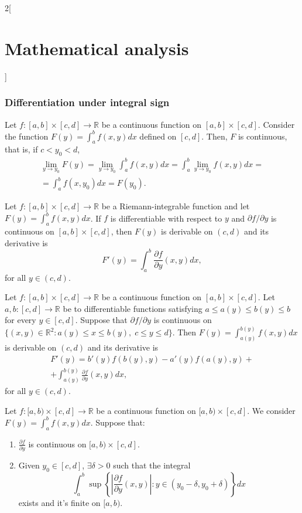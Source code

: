 \documentclass[class=article,crop=false]{standalone}
\begin{document}
\begin{multicols}{2}[\section{Mathematical analysis}]
\subsubsection*{Differentiation under integral sign}
\begin{theorem}
Let $f:[a,b]\times[c,d]\rightarrow\mathbb{R}$ be a continuous function on $[a,b]\times[c,d]$. Consider the function $\displaystyle F(y)=\int_a^bf(x,y)dx$ defined on $[c,d]$. Then, $F$ is continuous, that is, if $c<y_0<d$, \begin{multline*}
    \lim_{y\to y_0}F(y)=\lim_{y\to y_0}\int_a^bf(x,y)dx=\int_a^b\lim_{y\to y_0}f(x,y)dx=\\=\int_a^bf(x,y_0)dx=F(y_0).
\end{multline*}
\end{theorem}
\begin{theorem}
Let $f:[a,b]\times[c,d]\rightarrow\mathbb{R}$ be a Riemann-integrable function and let $\displaystyle F(y)=\int_a^bf(x,y)dx$. If $f$ is differentiable with respect to $y$ and $\partial f/\partial y$ is continuous on $[a,b]\times[c,d]$, then $F(y)$ is derivable on $(c,d)$ and its derivative is $$F'(y)=\int_a^b\frac{\partial f}{\partial y}(x,y)dx,$$ for all $y\in(c,d)$.
\end{theorem}
\begin{theorem}
Let $f:[a,b]\times[c,d]\rightarrow\mathbb{R}$ be a continuous function on $[a,b]\times[c,d]$. Let $a,b:[c,d]\rightarrow\mathbb{R}$ be to differentiable functions satisfying $a\leq a(y)\leq b(y)\leq b$ for every $y\in[c,d]$. Suppose that $\partial f/\partial y$ is continuous on $\{(x,y)\in\mathbb{R}^2:a(y)\leq x\leq b(y),\; c\leq y\leq d\}$. Then $\displaystyle F(y)=\int_{a(y)}^{b(y)}f(x,y)dx$ is derivable on $(c,d)$ and its derivative is \begin{multline*}
    F'(y)=b'(y)f(b(y),y)-a'(y)f(a(y),y)+\\+\int_{a(y)}^{b(y)}\frac{\partial f}{\partial y}(x,y)dx,
\end{multline*} for all $y\in(c,d)$.
\end{theorem}
\begin{theorem}
Let $f:[a,b)\times[c,d]\rightarrow\mathbb{R}$ be a continuous function on $[a,b)\times[c,d]$. We consider $\displaystyle F(y)=\int_a^bf(x,y)dx$. Suppose that: 
\begin{enumerate}
    \item $\displaystyle\frac{\partial f}{\partial y}$ is continuous on $[a,b)\times[c,d]$.
    \item Given $y_0\in[c,d]$, $\exists\delta>0$ such that the integral $$\int_a^b\sup\left\{\left|\frac{\partial f}{\partial y}(x,y)\right|:y\in(y_0-\delta,y_0+\delta)\right\}dx$$ exists and it's finite on $[a,b)$.

\end{enumerate}
\end{theorem}
\end{multicols}
\end{document}
